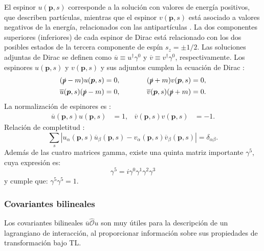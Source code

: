 El espinor $u(\boldsymbol{p},s)$ corresponde a la solución con valores de energía positivos, que describen partículas, mientras que el espinor $v(\boldsymbol{p},s)$ está asociado a valores negativos de la energía, relacionados con las antipartículas \cite{Donelly}. La dos componentes superiores (inferiores) de cada espinor de Dirac está relacionado con los dos posibles estados de la tercera componente de espín $s_z=\pm 1/2$. \cite{Bettini} Las soluciones adjuntas de Dirac se definen como $\overline{u} \equiv u^{\dagger} \gamma^{0}$ y $\overline{v} \equiv v^{\dagger} \gamma^{0}$, respectivamente. Los espinores $u(\boldsymbol{p},s)$ y $v(\boldsymbol{p},s)$ y sus adjuntos cumplen la ecuación de Dirac \cite{Donelly}:
\begin{equation}
\begin{aligned}
(\slashed{p}-m)u(\boldsymbol{p},s) &=0, \hspace{1cm} & (\slashed{p}+m)v(\boldsymbol{p},s) &=0, \\
\overline{u}(\boldsymbol{p},s)(\slashed{p}-m) &=0, \hspace{1cm} & \overline{v}(\boldsymbol{p},s )(\slashed{p}+m)&=0 .
\end{aligned}
\end{equation}
La normalización de espinores es \cite{MCR}:
\begin{align}
\overline{u}(\boldsymbol{p},s)u(\boldsymbol{p},s) &= 1, & \overline{v}(\boldsymbol{p},s)v(\boldsymbol{p},s) &= -1.
\end{align}
Relación de completitud \cite{MCR}:  %
\begin{equation}
\sum _{s}\left| u_{\alpha }\left(\boldsymbol{p},s\right) \overline{u}_{\beta }\left(\boldsymbol{p},s\right) -v_{\alpha }\left(\boldsymbol{p},s\right) \overline{v}_{\beta }\left(\boldsymbol{p},s\right) \right| =\delta _{\alpha \beta }.
\end{equation}
Además de las cuatro matrices gamma, existe una quinta matriz importante $\gamma^5$, cuya expresión es:
\begin{equation}
\gamma^5 = i \gamma^0 \gamma^1 \gamma^2 \gamma^3\label{eq:gamma5}
\end{equation}
y cumple que: $\gamma^5 \gamma^5 = 1$.

\subsubsection{Covariantes bilineales}\label{sec:bilinearcov}
Los covariantes bilineales $\overline{u}\widehat{\mathcal{O}}u$ son muy útiles para la descripción de un lagrangiano de interacción, al proporcionar información sobre sus propiedades de transformación bajo TL.

